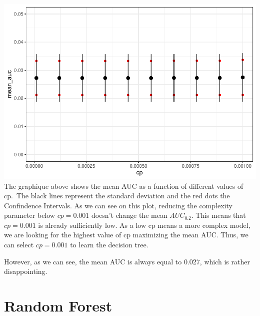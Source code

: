 \documentclass[
  12pt,
  oneside]{report}
\begin{document}
\includegraphics{leroy_francois_hw2_files/figure-latex/unnamed-chunk-11-1.pdf}
The graphique above shows the mean AUC as a function of different values of cp.~The black lines represent the standard deviation and the red dots the Confindence Intervals. As we can see on this plot, reducing the complexity parameter below \(cp = 0.001\) doesn't change the mean \(AUC_{0.2}\). This means that \(cp = 0.001\) is already sufficiently low. As a low cp means a more complex model, we are looking for the highest value of cp maximizing the mean AUC. Thus, we can select \(cp = 0.001\) to learn the decision tree.

However, as we can see, the mean AUC is always equal to 0.027, which is rather disappointing.

\hypertarget{random-forest}{%
\section{Random Forest}\label{random-forest}}
\end{document}
